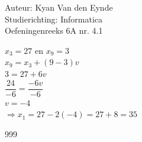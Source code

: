 \documentclass[a4paper]{article}
\begin{document}
  
\noindent \large Auteur: Kyan Van den Eynde \\
\noindent \large Studierichting: Informatica\\
\noindent \large Oefeningenreeks 6A nr. 4.1\\

\medskip

\normalsize

$x_3 = 27$ en $x_9 = 3$\\

$x_9 = x_3 + (9-3)v$\\

$3 = 27 + 6v$\\

$\dfrac{24}{-6} = \dfrac{-6v}{-6}$\\

$v = -4$\\

$\Rightarrow x_1 = 27-2(-4) = 27+8 = 35$\\

\begin{thebibliography}{999}
\end{thebibliography}
\end{document}
